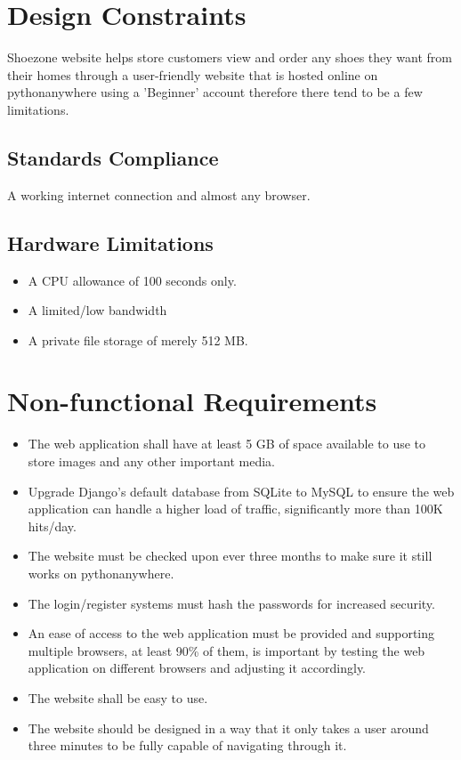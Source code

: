\documentclass[12pt]{article}
\begin{document}
\section{Design Constraints}
Shoezone website helps store customers view and order any shoes they want from their homes through a user-friendly website that is hosted online on pythonanywhere using a 'Beginner' account therefore there tend to be a few limitations. 

\subsection{ Standards Compliance}
A working internet connection and almost any browser.

\subsection{ Hardware Limitations}
\begin{itemize}
    \item A CPU allowance of 100 seconds only.
    \item A limited/low bandwidth
    \item A private file storage of merely 512 MB.
\end{itemize}

\section{Non-functional Requirements}
\begin{itemize}
\item The web application shall have at least 5 GB of space available to use to store images and any other important media.
\item Upgrade Django's default database from SQLite to MySQL to ensure the web application can handle a higher load of traffic, significantly more than 100K hits/day.
\item The website must be checked upon ever three months to make sure it still works on pythonanywhere.
\item The login/register systems must hash the passwords for increased security.
\item An ease of access to the web application must be provided and supporting multiple browsers, at least 90\% of them, is important by testing the web application on different browsers and adjusting it accordingly.
\item The website shall be easy to use.
\item The website should be designed in a way that it only takes a user around three minutes to be fully capable of navigating through it.

\end{itemize}
\end{document}
